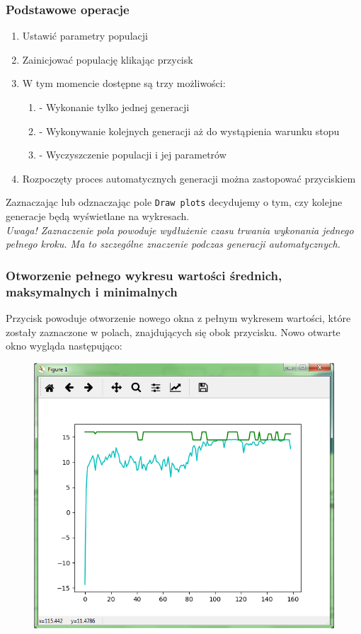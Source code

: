 \documentclass[a4paper,11pt]{article}
\begin{document}
			\subsubsection{Podstawowe operacje}
				\begin{enumerate}
					\item Ustawić parametry populacji
					\item Zainicjować populację klikając przycisk 
					\item W tym momencie dostępne są trzy możliwości:
					\begin{enumerate}
						\item {} - Wykonanie tylko jednej generacji
						\item {} - Wykonywanie kolejnych generacji aż do wystąpienia warunku stopu
						\item {} - Wyczyszczenie populacji i jej parametrów
					\end{enumerate}
					\item Rozpoczęty proces automatycznych generacji można zastopować przyciskiem 
				\end{enumerate}
				
				Zaznaczając lub odznaczając pole \texttt{Draw plots} decydujemy o tym, czy kolejne generacje będą wyświetlane na wykresach.\\
				\emph{Uwaga! Zaznaczenie pola powoduje wydłużenie czasu trwania wykonania jednego pełnego kroku. Ma to szczególne znaczenie podczas generacji automatycznych.}
			\subsubsection{Otworzenie pełnego wykresu wartości średnich, maksymalnych i minimalnych}
			Przycisk  powoduje otworzenie nowego okna z pełnym wykresem wartości, które zostały zaznaczone w polach, znajdujących się obok przycisku. Nowo otwarte okno wygląda następująco: 
			\begin{figure}[H]
				\centering
				\includegraphics[scale=0.8]{full_plot.png}
			\end{figure}
				
\end{document}
